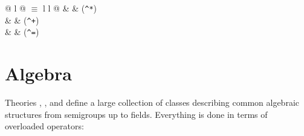 \begin{isabellebody}
\begin{isamarkuptext}
\begin{tabular}{@ {} l @ {\quad$\equiv$\quad} l l @ {}}
 &  & (\verb$^*$)\\
 &  & (\verb$^+$)\\
 &  & (\verb$^=$)
\end{tabular}


\section{Algebra}

Theories , ,  and  define a large collection of classes describing common algebraic
structures from semigroups up to fields. Everything is done in terms of
overloaded operators:


\end{isamarkuptext}
\end{isabellebody}
